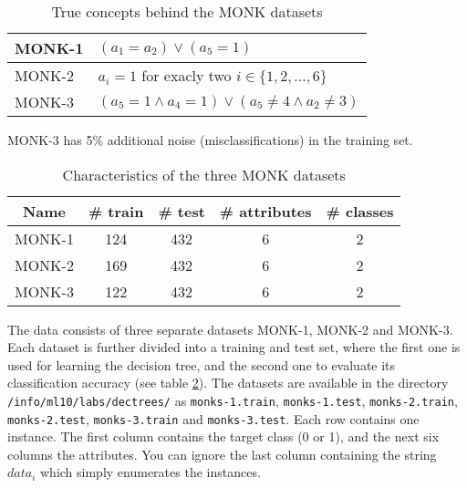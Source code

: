 \documentclass[11pt]{article}
\begin{document}
\begin{table}
  \caption{True concepts behind the MONK datasets \label{tab:truemonk}}
  \begin{center}
    \begin{tabular}{|l|l|}
      \hline
      MONK-1 & \((a_1=a_2)\vee(a_5=1)\)\\
      \hline
      MONK-2 & \(a_i=1\) for exacly two \(i \in \{1, 2, \ldots, 6\}\)\\
      \hline
      MONK-3 & \((a_5=1 \wedge a_4=1) \vee (a_5\ne 4 \wedge a_2\ne 3)\)\\
      \hline
    \end{tabular}
  \end{center}
  MONK-3 has 5\% additional noise (misclassifications) in the training set.
\end{table}

\begin{table}
  \caption{Characteristics of the three MONK datasets \label{tab:monk}}
  \begin{center}
    \begin{tabular}{|c|c|c|c|c|}\hline
      Name & \# train & \# test & \# attributes & \# classes\\ \hline \hline
      MONK-1 & 124 & 432 & 6 & 2\\ \hline
      MONK-2 & 169 & 432 & 6 & 2\\ \hline
      MONK-3 & 122 & 432 & 6 & 2\\ \hline
    \end{tabular}
  \end{center}
\end{table}

The data consists of three separate datasets MONK-1, MONK-2 and
MONK-3.  Each dataset is further divided into a training and test set,
where the first one is used for learning the decision tree, and the
second one to evaluate its classification accuracy (see table
\ref{tab:monk}).  The datasets are available in
the directory \verb#/info/ml10/labs/dectrees/# as
\verb#monks-1.train#, \verb#monks-1.test#, \verb#monks-2.train#,
\verb#monks-2.test#, \verb#monks-3.train# and \verb#monks-3.test#.
Each row contains one instance.  The first column contains the target
class (0 or 1), and the next six columns the attributes.  You can
ignore the last column containing the string $data_i$ which simply
enumerates the instances.
\end{document}
